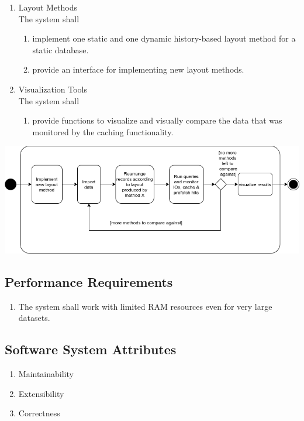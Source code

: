 \begin{enumerate}[label*=\arabic*]
\item Layout Methods \\
    The system shall
\begin{enumerate}[label*=\arabic*]
	\item implement one static and one dynamic history-based layout method for a static database.
	\item provide an interface for implementing new layout methods.
\end{enumerate}

\item Visualization Tools \\
    The system shall
\begin{enumerate}[label*=\arabic*]
    \item provide functions to visualize and visually compare the data that was monitored by the caching functionality.
\end{enumerate}
\end{enumerate}
\begin{center}
 \includegraphics[keepaspectratio, width=\textwidth]{img/activity.png}
\end{center}


\subsection{Performance Requirements}
\begin{enumerate}[label*=\arabic*]
		\item The system shall work with limited RAM resources even for very large datasets.
\end{enumerate}

\subsection{Software System Attributes}
\begin{enumerate}[label*=\arabic*]
		\item Maintainability
		\item Extensibility
		\item Correctness
\end{enumerate}





      

      
